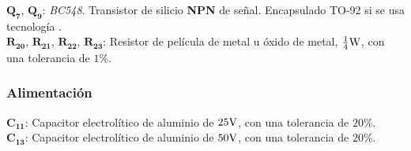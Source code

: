 $\bm{Q_{7}}$, $\bm{Q_{9}}$: \textit{BC548}. Transistor de silicio \textbf{NPN} de señal. Encapsulado TO-92 si se usa tecnología .\\


$\bm{R_{20}}$, $\bm{R_{21}}$, $\bm{R_{22}}$, $\bm{R_{23}}$: Resistor de película de metal u óxido de metal, $\frac{1}{4} \si[per-mode=symbol]{\watt}$, con una tolerancia de $1 \%$.\\



\subsubsection{Alimentación}

$\bm{C_{11}}$: Capacitor electrolítico de aluminio de $25 \si[per-mode=symbol]{\volt}$, con una tolerancia de $20 \%$.\\

 $\bm{C_{13}}$: Capacitor electrolítico de aluminio de $50 \si[per-mode=symbol]{\volt}$, con una tolerancia de $20 \%$.\\








\vfill

\clearpage

